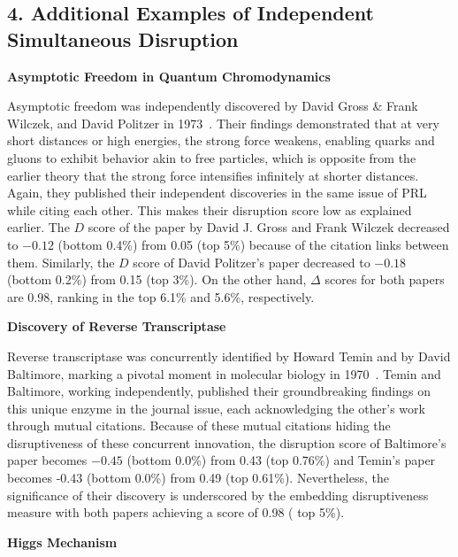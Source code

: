 \documentclass[12pt]{article}
\begin{document}
\begin{refsection}
\subsection*{4. Additional Examples of Independent 
Simultaneous Disruption}
\label{suppinfo:additional_disruption_simultaneous}

\normalsize
\textbf{Asymptotic Freedom in Quantum Chromodynamics}

Asymptotic freedom was independently discovered by David Gross \& Frank Wilczek, and David Politzer in 1973~\cite{gross1973ultraviolet, politzer1973reliable}. Their findings demonstrated that at very short distances or high energies, the strong force weakens, enabling quarks and gluons to exhibit behavior akin to free particles, which is opposite from the earlier theory that the strong force intensifies infinitely at shorter distances. Again, they published their independent discoveries in the same issue of PRL while citing each other. This makes their disruption score low as explained earlier. The $D$ score of the paper by David J. Gross and Frank Wilczek decreased to $-0.12$ (bottom 0.4\%) from 0.05 (top 5\%) because of the citation links between them. Similarly, the $D$ score of David Politzer's paper decreased to $-0.18$ (bottom 0.2\%) from 0.15 (top 3\%). On the other hand, $\Delta$ scores for both papers are 0.98, ranking in the top 6.1\% and 5.6\%, respectively.



\textbf{Discovery of Reverse Transcriptase}


Reverse transcriptase was concurrently identified by Howard Temin and by David Baltimore, marking a pivotal moment in molecular biology in 1970~\cite{temin1970rna,baltimore1970viral}. Temin and Baltimore, working independently, published their groundbreaking findings on this unique enzyme in the journal issue, each acknowledging the other's work through mutual citations. Because of these mutual citations hiding the disruptiveness of these concurrent innovation, the disruption score of Baltimore's paper becomes $-0.45$ (bottom 0.0\%) from 0.43 (top 0.76\%) and Temin's paper becomes -0.43 (bottom 0.0\%) from 0.49 (top 0.61\%). Nevertheless, the significance of their discovery is underscored by the embedding disruptiveness measure with both papers achieving a score of 0.98 ( top 5\%).


\textbf{Higgs Mechanism}


\end{refsection}
\end{document}
